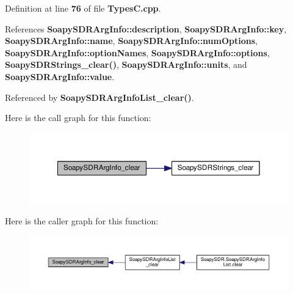 Definition at line {\bf 76} of file {\bf Types\+C.\+cpp}.



References {\bf Soapy\+S\+D\+R\+Arg\+Info\+::description}, {\bf Soapy\+S\+D\+R\+Arg\+Info\+::key}, {\bf Soapy\+S\+D\+R\+Arg\+Info\+::name}, {\bf Soapy\+S\+D\+R\+Arg\+Info\+::num\+Options}, {\bf Soapy\+S\+D\+R\+Arg\+Info\+::option\+Names}, {\bf Soapy\+S\+D\+R\+Arg\+Info\+::options}, {\bf Soapy\+S\+D\+R\+Strings\+\_\+clear()}, {\bf Soapy\+S\+D\+R\+Arg\+Info\+::units}, and {\bf Soapy\+S\+D\+R\+Arg\+Info\+::value}.



Referenced by {\bf Soapy\+S\+D\+R\+Arg\+Info\+List\+\_\+clear()}.



Here is the call graph for this function\+:
\nopagebreak
\begin{figure}[H]
\begin{center}
\leavevmode
\includegraphics[width=350pt]{d2/d9d/TypesC_8cpp_a8d0d73c568a18edf74ca220198bd7fd2_cgraph}
\end{center}
\end{figure}




Here is the caller graph for this function\+:
\nopagebreak
\begin{figure}[H]
\begin{center}
\leavevmode
\includegraphics[width=350pt]{d2/d9d/TypesC_8cpp_a8d0d73c568a18edf74ca220198bd7fd2_icgraph}
\end{center}
\end{figure}


